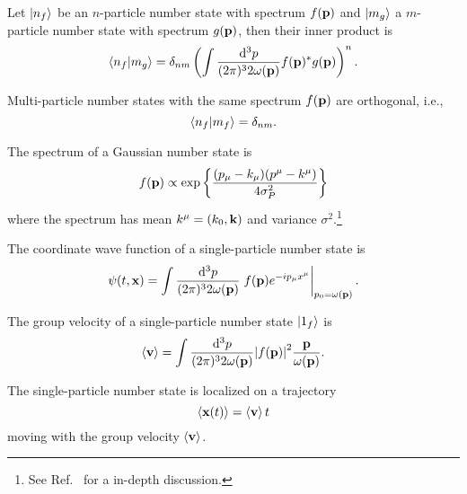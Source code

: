 \begin{theorem}\label{thm:number_state_inner_product}
	Let $\ket{n_f}$ be an $n$-particle number state with spectrum $f(\vb{p})$ and $\ket{m_g}$ a $m$-particle number state with spectrum $g(\vb{p})$, then their inner product is
	\begin{equation}
		\braket{n_f}{m_g}
		=
		\delta_{nm}
		\left(
			\int\frac{\dd[3]{p}}{(2\pi)^32\omega(\vb{p})}
			f(\vb{p})^*
			g(\vb{p})
		\right)^n
		.
	\end{equation}
\end{theorem}
\begin{corollary}
	Multi-particle number states with the same spectrum $f(\vb{p})$ are orthogonal, i.e.,
	\begin{equation}
		\braket{n_f}{m_f}
		=
		\delta_{nm}
		.
	\end{equation}
\end{corollary}
\begin{example}
	The spectrum of a Gaussian number state is
	\begin{equation}
		f(\vb{p})
		\propto
		\exp\left\{
			\frac{(p_\mu-k_\mu)(p^\mu-k^\mu)}{4\sigma_P^2}
		\right\}
		\label{eq:covariant_gaussian_spectrum}
	\end{equation}
	where the spectrum has mean $k^\mu=(k_0,\vb{k})$ and variance $\sigma^2$.\footnote{See Ref.~\cite{Naumov2013,Naumov2009} for a in-depth discussion.}
\end{example}
\begin{lemma}\label{thm:single_particle_number_state_wave_function}
	The coordinate wave function of a single-particle number state is
	\begin{equation}
		\psi(t,\vb{x})
		=
		\int\frac{\dd[3]{p}}{(2\pi)^32\omega(\vb{p})}
		\eval{
			f(\vb{p})
			e^{-ip_\mu x^\mu}
		}_{p_0=\omega(\vb{p})}
		.
	\end{equation}
\end{lemma}
\begin{lemma}\label{thm:single_particle_number_state_group_velocity}
	The group velocity of a single-particle number state $\ket{1_f}$ is
	\begin{equation}
		\expval{\vb{v}}
		=
		\int\frac{\dd[3]{p}}{(2\pi)^32\omega(\vb{p})}
		\abs{f(\vb{p})}^2
		\frac{\vb{p}}{\omega(\vb{p})}
		\label{eq:single_particle_number_state_group_velocity}
		.
	\end{equation}
\end{lemma}
\begin{lemma}
	The single-particle number state is localized on a trajectory
	\begin{equation}
		\expval{\vb{x}(t)}
		=
		\expval{\vb{v}}t
	\end{equation}
	moving with the group velocity $\expval{\vb{v}}$.
\end{lemma}
